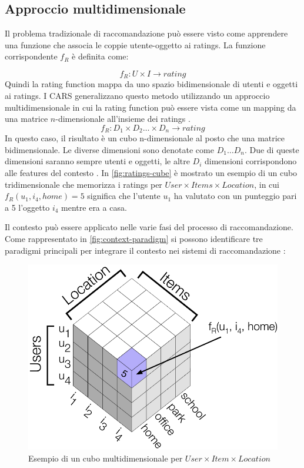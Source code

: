 \documentclass[12pt,italian]{report}
\begin{document}
\subsection{Approccio multidimensionale}
Il problema tradizionale di raccomandazione può essere visto come apprendere una funzione che associa le coppie utente-oggetto ai ratings. La funzione corrispondente $f_R$ è definita come:

$$
f_R : U \times I \rightarrow rating
$$
Quindi la rating function mappa da uno spazio bidimensionale di utenti e oggetti ai ratings.
I CARS generalizzano questo metodo utilizzando un approccio multidimensionale in cui la rating function può essere vista come un mapping da una matrice $n$-dimensionale all'insieme dei ratings \cite{survey-mattia}.
$$
f_R : D_1 \times D_2 \dots \times D_n \rightarrow rating
$$
In questo caso, il risultato è un cubo n-dimensionale al posto che una matrice bidimensionale. Le diverse dimensioni sono denotate come $D_1 \dots D_n$. Due di queste dimensioni saranno sempre utenti e oggetti, le altre $D_i$ dimensioni corrispondono alle features del contesto \cite{recsys-book}. In \autoref{fig:ratings-cube} è mostrato un esempio di un cubo tridimensionale che memorizza i ratings per $User \times Items \times Location$, in cui $f_R(u_1, i_4, home) = 5$ significa che l'utente $u_1$ ha valutato con un punteggio pari a 5 l'oggetto $i_4$ mentre era a casa.

Il contesto può essere applicato nelle varie fasi del processo di raccomandazione. Come rappresentato in \autoref{fig:context-paradigm} si possono identificare tre paradigmi principali per integrare il contesto nei sistemi di raccomandazione \cite{recsys-handbook}:

\begin{figure}
  \centering
  \includegraphics[scale=0.80]{immagini/rating_cube.png}
  \caption{Esempio di un cubo multidimensionale per $User \times Item \times Location$}
  \label{fig:ratings-cube}
\end{figure}
\end{document}
